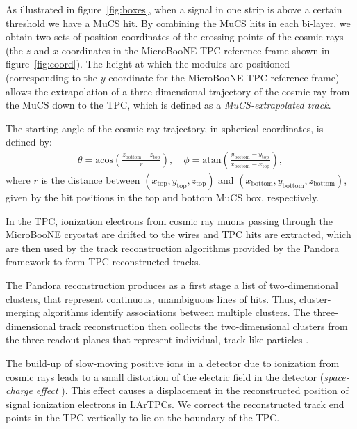 \documentclass[a4paper,11pt]{article}
\begin{document}
As illustrated in figure~\ref{fig:boxes}, when a signal in one strip is above a certain threshold we have a MuCS hit. By combining the MuCS hits in each bi-layer, we obtain two sets of position coordinates of the crossing points of the cosmic rays (the $z$ and $x$ coordinates in the MicroBooNE TPC reference frame shown in figure~\ref{fig:coord}). The height at which the modules are positioned (corresponding to the $y$ coordinate for the MicroBooNE TPC reference frame) allows the extrapolation of a three-dimensional trajectory of the cosmic ray from the MuCS down to the TPC, which is defined as a \emph{MuCS-extrapolated track}.

The starting angle of the cosmic ray trajectory, in spherical coordinates, is defined by:
\begin{align}\label{eq:angles_mucs}
  \theta = \mathrm{acos}\left(\frac{z_{\mathrm{bottom}}-z_{\mathrm{top}}}{r}\right), \quad
  \phi = \mathrm{atan}\left(\frac{y_{\mathrm{bottom}}-y_{\mathrm{top}}}{x_{\mathrm{bottom}}-x_{\mathrm{top}}}\right),
\end{align}
where $r$ is the distance between $(x_{\mathrm{top}},y_{\mathrm{top}},z_{\mathrm{top}})$ and $(x_{\mathrm{bottom}},y_{\mathrm{bottom}},z_{\mathrm{bottom}})$, given by the hit positions in the top and bottom MuCS box, respectively.

In the TPC, ionization electrons from cosmic ray muons passing through the MicroBooNE cryostat are drifted to the wires and TPC hits are extracted, which are then used by the track reconstruction algorithms provided by the Pandora framework \cite{pandora} to form TPC reconstructed tracks. 

The Pandora reconstruction produces as a first stage a list of two-dimensional clusters, that represent continuous, unambiguous lines of hits. Thus, cluster-merging algorithms identify associations between multiple clusters. The three-dimensional track reconstruction then collects the two-dimensional clusters from the three readout planes that represent individual, track-like particles \cite{pandora2}. 

The build-up of slow-moving positive ions in a detector due to ionization from cosmic rays leads to a small distortion of the electric field in the detector (\emph{space-charge effect} \cite{sce}). This effect causes a displacement in the reconstructed position of signal ionization electrons in LArTPCs. We correct the reconstructed track end points in the TPC vertically to lie on the boundary of the TPC.
\end{document}
